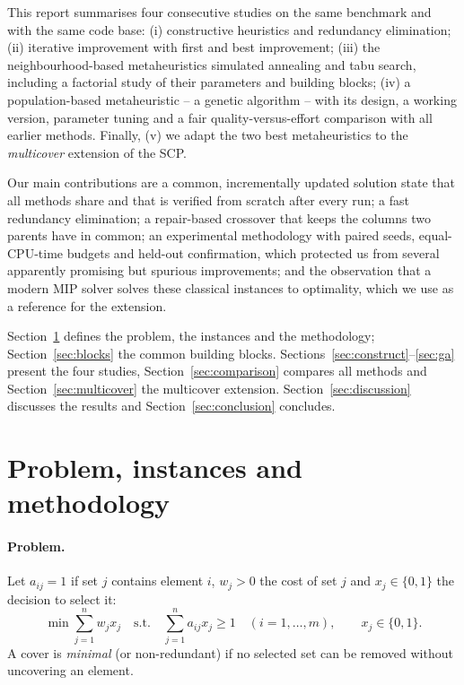 \documentclass[11pt,a4paper]{article}
\begin{document}
This report summarises four consecutive studies on the same benchmark and with the same code base:
(i) constructive heuristics and redundancy elimination;
(ii) iterative improvement with first and best improvement;
(iii) the neighbourhood-based metaheuristics simulated annealing and tabu search, including a factorial study of their parameters and building blocks;
(iv) a population-based metaheuristic -- a genetic algorithm -- with its design, a working version, parameter tuning and a fair quality-versus-effort comparison with all earlier methods.
Finally, (v) we adapt the two best metaheuristics to the \emph{multicover} extension of the SCP.

Our main contributions are a common, incrementally updated solution state that all methods share and that is verified from scratch after every run; a fast redundancy elimination; a repair-based crossover that keeps the columns two parents have in common;
an experimental methodology with paired seeds, equal-CPU-time budgets and held-out confirmation, which protected us from several apparently promising but spurious improvements; and the observation that a modern MIP solver solves these classical instances to optimality, which we use as a reference for the extension.

Section~\ref{sec:problem} defines the problem, the instances and the methodology; Section~\ref{sec:blocks} the common building blocks.
Sections~\ref{sec:construct}--\ref{sec:ga} present the four studies, Section~\ref{sec:comparison} compares all methods and Section~\ref{sec:multicover} the multicover extension. Section~\ref{sec:discussion} discusses the results and Section~\ref{sec:conclusion} concludes.

\section{Problem, instances and methodology}\label{sec:problem}
\paragraph{Problem.} Let $a_{ij}=1$ if set $j$ contains element $i$, $w_j>0$ the cost of set $j$ and $x_j\in\{0,1\}$ the decision to select it:
\begin{equation}
\min \sum_{j=1}^{n} w_j x_j \quad \text{s.t.}\quad \sum_{j=1}^{n} a_{ij}x_j \ge 1 \quad (i=1,\dots,m), \qquad x_j\in\{0,1\}. \label{eq:scp}
\end{equation}
A cover is \emph{minimal} (or non-redundant) if no selected set can be removed without uncovering an element.
\end{document}
